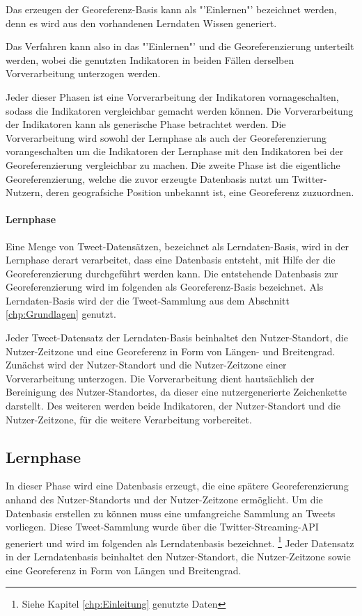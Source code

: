 	Das erzeugen der Georeferenz-Basis kann als "'Einlernen"' bezeichnet werden, denn es wird aus den vorhandenen Lerndaten Wissen generiert.

	Das Verfahren kann also in das "'Einlernen"' und die Georeferenzierung unterteilt werden, wobei die genutzten Indikatoren in beiden Fällen derselben Vorverarbeitung unterzogen werden.


	

	Jeder dieser Phasen ist eine Vorverarbeitung der Indikatoren vornageschalten, sodass die Indikatoren vergleichbar gemacht werden können.
	Die Vorverarbeitung der Indikatoren kann als generische Phase betrachtet werden.
	Die Vorverarbeitung wird sowohl der Lernphase als auch der Georeferenzierung vorangeschalten um die Indikatoren der Lernphase mit den Indikatoren bei der Georeferenzierung vergleichbar zu machen.  
	Die zweite Phase ist die eigentliche Georeferenzierung, welche die zuvor erzeugte Datenbasis nutzt um Twitter-Nutzern, deren geografsiche Position unbekannt ist, eine Georeferenz zuzuordnen.  

	\paragraph{Lernphase}
	Eine Menge von Tweet-Datensätzen, bezeichnet als Lerndaten-Basis, wird in der Lernphase derart verarbeitet, dass eine Datenbasis entsteht, mit Hilfe der die Georeferenzierung durchgeführt werden kann.
	Die entstehende Datenbasis zur Georeferenzierung wird im folgenden als Georeferenz-Basis bezeichnet.
	Als Lerndaten-Basis wird der die Tweet-Sammlung aus dem Abschnitt \ref{chp:Grundlagen} genutzt. 

	Jeder Tweet-Datensatz der Lerndaten-Basis beinhaltet den Nutzer-Standort, die Nutzer-Zeitzone und eine Georeferenz in Form von Längen- und Breitengrad.
	Zunächst wird der Nutzer-Standort und die Nutzer-Zeitzone einer Vorverarbeitung unterzogen. 
	Die Vorverarbeitung dient hautsächlich der Bereinigung des Nutzer-Standortes, da dieser eine nutzergenerierte Zeichenkette darstellt. 
	Des weiteren werden beide Indikatoren, der Nutzer-Standort und die Nutzer-Zeitzone, für die weitere Verarbeitung vorbereitet. 



	\subsection{Lernphase}
	In dieser Phase wird eine Datenbasis erzeugt, die eine spätere Georeferenzierung anhand des Nutzer-Standorts und der Nutzer-Zeitzone ermöglicht. 
	Um die Datenbasis erstellen zu können muss eine umfangreiche Sammlung an Tweets vorliegen.
	Diese Tweet-Sammlung wurde über die Twitter-Streaming-API generiert und wird im folgenden als Lerndatenbasis bezeichnet. \footnote{Siehe Kapitel \ref{chp:Einleitung} genutzte Daten} 
	Jeder Datensatz in der Lerndatenbasis beinhaltet den Nutzer-Standort, die Nutzer-Zeitzone sowie eine Georeferenz in Form von Längen und Breitengrad.
	
